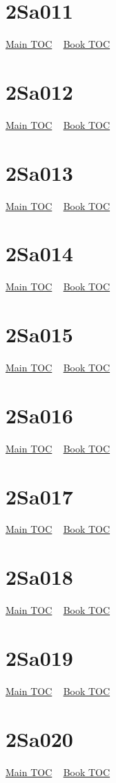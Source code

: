 \documentclass{book}
\begin{document}
  \section{2Sa011}\hyperlink{toc}{Main TOC} ~ \hyperref[subsec:2Sa]{Book TOC} 
  \section{2Sa012}\hyperlink{toc}{Main TOC} ~ \hyperref[subsec:2Sa]{Book TOC} 
  \section{2Sa013}\hyperlink{toc}{Main TOC} ~ \hyperref[subsec:2Sa]{Book TOC} 
  \section{2Sa014}\hyperlink{toc}{Main TOC} ~ \hyperref[subsec:2Sa]{Book TOC} 
  \section{2Sa015}\hyperlink{toc}{Main TOC} ~ \hyperref[subsec:2Sa]{Book TOC} 
  \section{2Sa016}\hyperlink{toc}{Main TOC} ~ \hyperref[subsec:2Sa]{Book TOC} 
  \section{2Sa017}\hyperlink{toc}{Main TOC} ~ \hyperref[subsec:2Sa]{Book TOC} 
  \section{2Sa018}\hyperlink{toc}{Main TOC} ~ \hyperref[subsec:2Sa]{Book TOC} 
  \section{2Sa019}\hyperlink{toc}{Main TOC} ~ \hyperref[subsec:2Sa]{Book TOC} 
  \section{2Sa020}\hyperlink{toc}{Main TOC} ~ \hyperref[subsec:2Sa]{Book TOC} 
\end{document}
